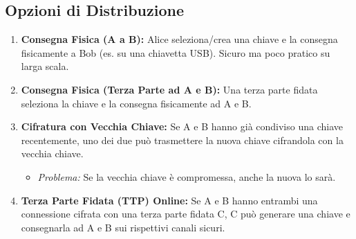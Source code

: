 \subsection{Opzioni di Distribuzione}
\begin{enumerate}
    \item \textbf{Consegna Fisica (A a B):} Alice seleziona/crea una chiave e la consegna fisicamente a Bob (es. su una chiavetta USB). Sicuro ma poco pratico su larga scala.
    \item \textbf{Consegna Fisica (Terza Parte ad A e B):} Una terza parte fidata seleziona la chiave e la consegna fisicamente ad A e B.
    \item \textbf{Cifratura con Vecchia Chiave:} Se A e B hanno già condiviso una chiave recentemente, uno dei due può trasmettere la nuova chiave cifrandola con la vecchia chiave.
        \begin{itemize}
            \item \textit{Problema:} Se la vecchia chiave è compromessa, anche la nuova lo sarà.
        \end{itemize}
    \item \textbf{Terza Parte Fidata (TTP) Online:} Se A e B hanno entrambi una connessione cifrata con una terza parte fidata C, C può generare una chiave e consegnarla ad A e B sui rispettivi canali sicuri.
\end{enumerate}

